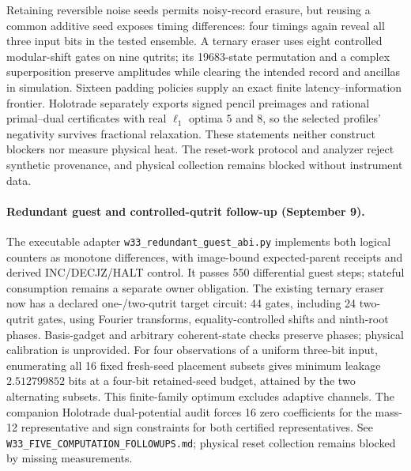 Retaining reversible noise seeds permits noisy-record erasure, but reusing a
common additive seed exposes timing differences: four timings again reveal all
three input bits in the tested ensemble. A ternary eraser uses eight controlled
modular-shift gates on nine qutrits; its 19683-state permutation and a complex
superposition preserve amplitudes while clearing the intended record and
ancillas in simulation. Sixteen padding policies supply an exact finite
latency--information frontier. Holotrade separately exports signed pencil
preimages and rational primal--dual certificates with real $\ell_1$ optima 5
and 8, so the selected profiles' negativity survives fractional relaxation.
These statements neither construct blockers nor measure physical heat. The
reset-work protocol and analyzer reject synthetic provenance, and physical
collection remains blocked without instrument data.

\paragraph{Redundant guest and controlled-qutrit follow-up (September 9).}
The executable adapter \texttt{w33\_redundant\_guest\_abi.py} implements
both logical counters as monotone differences, with image-bound expected-parent
receipts and derived INC/DECJZ/HALT control.  It passes 550 differential guest
steps; stateful consumption remains a separate owner obligation.
The existing ternary eraser now has a declared one-/two-qutrit target circuit:
44 gates, including 24 two-qutrit gates, using Fourier transforms,
equality-controlled shifts and ninth-root phases.  Basis-gadget and arbitrary
coherent-state checks preserve phases; physical calibration is unprovided.
For four observations of a uniform three-bit input, enumerating all 16 fixed
fresh-seed placement subsets gives minimum leakage $2.512799852$ bits at a
four-bit retained-seed budget, attained by the two alternating subsets.
This finite-family optimum excludes adaptive channels.  The companion
Holotrade dual-potential audit forces 16 zero coefficients for the mass-12
representative and sign constraints for both certified representatives.
See \texttt{W33\_FIVE\_COMPUTATION\_FOLLOWUPS.md}; physical reset collection
remains blocked by missing measurements.

